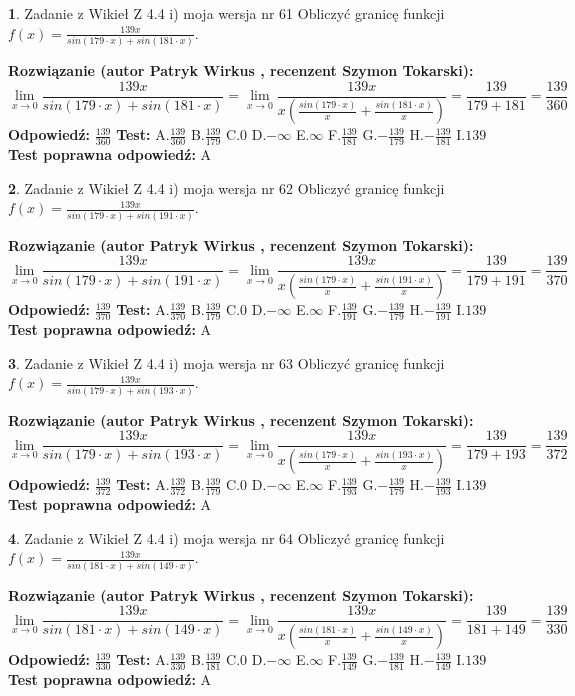 \documentclass[12pt, a4paper]{article}
\theoremstyle{definition} %
\newtheorem{zad}{}
\newcommand{\zadStart}[1]{\begin{zad}#1\newline}
\newcommand{\zadStop}{\end{zad}}
\newcommand{\rozwStart}[2]{\noindent \textbf{Rozwiązanie (autor #1 , recenzent #2): }\newline}
\newcommand{\rozwStop}{\newline}
\newcommand{\odpStart}{\noindent \textbf{Odpowiedź:}\newline}
\newcommand{\odpStop}{\newline}
\newcommand{\testStart}{\noindent \textbf{Test:}\newline}
\newcommand{\testStop}{\newline}
\newcommand{\kluczStart}{\noindent \textbf{Test poprawna odpowiedź:}\newline}
\newcommand{\kluczStop}{\newline}
\begin{document}
\zadStart{Zadanie z Wikieł Z 4.4 i) moja wersja nr 61}
Obliczyć granicę funkcji $f(x)=\frac{139x}{sin(179\cdot x) +sin(181\cdot x)}$.
\zadStop
\rozwStart{Patryk Wirkus}{Szymon Tokarski}
$$\lim\limits_{x\to 0}\frac{139x}{sin(179\cdot x) +sin(181\cdot x)}=\lim\limits_{x\to 0}\frac{139x}{x(\frac{sin(179\cdot x)}{x}+\frac{sin(181\cdot x)}{x})}=\frac{139}{179+181} = \frac{139}{360}$$
\rozwStop
\odpStart
$\frac{139}{360}$
\odpStop
\testStart
A.$\frac{139}{360}$
B.$\frac{139}{179}$
C.$0$
D.$-\infty$
E.$\infty$
F.$\frac{139}{181}$
G.$-\frac{139}{179}$
H.$-\frac{139}{181}$
I.$139$
\testStop
\kluczStart
A
\kluczStop



\zadStart{Zadanie z Wikieł Z 4.4 i) moja wersja nr 62}
Obliczyć granicę funkcji $f(x)=\frac{139x}{sin(179\cdot x) +sin(191\cdot x)}$.
\zadStop
\rozwStart{Patryk Wirkus}{Szymon Tokarski}
$$\lim\limits_{x\to 0}\frac{139x}{sin(179\cdot x) +sin(191\cdot x)}=\lim\limits_{x\to 0}\frac{139x}{x(\frac{sin(179\cdot x)}{x}+\frac{sin(191\cdot x)}{x})}=\frac{139}{179+191} = \frac{139}{370}$$
\rozwStop
\odpStart
$\frac{139}{370}$
\odpStop
\testStart
A.$\frac{139}{370}$
B.$\frac{139}{179}$
C.$0$
D.$-\infty$
E.$\infty$
F.$\frac{139}{191}$
G.$-\frac{139}{179}$
H.$-\frac{139}{191}$
I.$139$
\testStop
\kluczStart
A
\kluczStop



\zadStart{Zadanie z Wikieł Z 4.4 i) moja wersja nr 63}
Obliczyć granicę funkcji $f(x)=\frac{139x}{sin(179\cdot x) +sin(193\cdot x)}$.
\zadStop
\rozwStart{Patryk Wirkus}{Szymon Tokarski}
$$\lim\limits_{x\to 0}\frac{139x}{sin(179\cdot x) +sin(193\cdot x)}=\lim\limits_{x\to 0}\frac{139x}{x(\frac{sin(179\cdot x)}{x}+\frac{sin(193\cdot x)}{x})}=\frac{139}{179+193} = \frac{139}{372}$$
\rozwStop
\odpStart
$\frac{139}{372}$
\odpStop
\testStart
A.$\frac{139}{372}$
B.$\frac{139}{179}$
C.$0$
D.$-\infty$
E.$\infty$
F.$\frac{139}{193}$
G.$-\frac{139}{179}$
H.$-\frac{139}{193}$
I.$139$
\testStop
\kluczStart
A
\kluczStop



\zadStart{Zadanie z Wikieł Z 4.4 i) moja wersja nr 64}
Obliczyć granicę funkcji $f(x)=\frac{139x}{sin(181\cdot x) +sin(149\cdot x)}$.
\zadStop
\rozwStart{Patryk Wirkus}{Szymon Tokarski}
$$\lim\limits_{x\to 0}\frac{139x}{sin(181\cdot x) +sin(149\cdot x)}=\lim\limits_{x\to 0}\frac{139x}{x(\frac{sin(181\cdot x)}{x}+\frac{sin(149\cdot x)}{x})}=\frac{139}{181+149} = \frac{139}{330}$$
\rozwStop
\odpStart
$\frac{139}{330}$
\odpStop
\testStart
A.$\frac{139}{330}$
B.$\frac{139}{181}$
C.$0$
D.$-\infty$
E.$\infty$
F.$\frac{139}{149}$
G.$-\frac{139}{181}$
H.$-\frac{139}{149}$
I.$139$
\testStop
\kluczStart
A
\kluczStop
\end{document}
